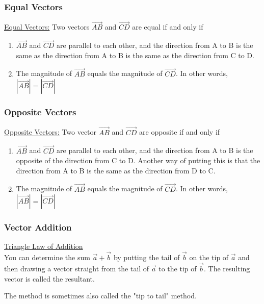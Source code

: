 \documentclass{article}
\begin{document}
\subsubsection{Equal Vectors}
\underline{Equal Vectors:}
Two vectors $\overrightarrow{AB}$ and $\overrightarrow{CD}$ are equal if and only if\\

\begin{enumerate}
    \item $\overrightarrow{AB}$ and $\overrightarrow{CD}$ are parallel to each other, and the direction from A to B is the same as the direction from A to B is the same as the direction from C to D.
    \item The magnitude of $\overrightarrow{AB}$ equals the magnitude of $\overrightarrow{CD}$. In other words, $|\overrightarrow{AB}|=|\overrightarrow{CD}|$
\end{enumerate}
\subsubsection{Opposite Vectors}
\underline{Opposite Vectors:}
Two vector $\overrightarrow{AB}$ and $\overrightarrow{CD}$ are opposite if and only if
\begin{enumerate}
    \item $\overrightarrow{AB}$ and $\overrightarrow{CD}$ are parallel to each other, and the direction from A to B is the opposite of the direction from C to D. Another way of putting this is that the direction from A to B is the same as the direction from D to C.
    \item The magnitude of $\overrightarrow{AB}$ equals the magnitude of $\overrightarrow{CD}$. In other words, $|\overrightarrow{AB}|=|\overrightarrow{CD}|$
\end{enumerate}
\subsubsection{Vector Addition}
\underline{Triangle Law of Addition}\\

You can determine the sum $\vec{a}+\vec{b}$ by putting the tail of $\vec{b}$ on the tip of $\vec{a}$ and then drawing a vector straight from the tail of $\vec{a}$ to the tip of $\vec{b}$. The resulting vector is called the resultant.

The method is sometimes also called the "tip to tail" method.
\begin{center}
\end{center}
\end{document}
